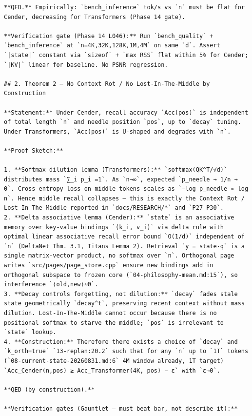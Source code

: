 \begin{verbatim}
**QED.** Empirically: `bench_inference` tok/s vs `n` must be flat for Cender, decreasing for Transformers (Phase 14 gate).

**Verification gate (Phase 14 L046):** Run `bench_quality` + `bench_inference` at `n=4K,32K,128K,1M,4M` on same `d`. Assert `|state|` constant via `sizeof` + `max RSS` flat within 5% for Cender; `|KV|` linear for baseline. No PSNR regression.

## 2. Theorem 2 — No Context Rot / No Lost-In-The-Middle by Construction

**Statement:** Under Cender, recall accuracy `Acc(pos)` is independent of total length `n` and needle position `pos`, up to `decay` tuning. Under Transformers, `Acc(pos)` is U-shaped and degrades with `n`.

**Proof Sketch:**

1. **Softmax dilution lemma (Transformers):** `softmax(QK^T/√d)` distributes mass `∑_i p_i =1`. As `n→∞`, expected `p_needle → 1/n → 0`. Cross-entropy loss on middle tokens scales as `−log p_needle ∝ log n`. Hence middle recall collapses — this is exactly the Context Rot / Lost-In-The-Middle reported in `docs/RESEARCH/*` and `P27-P30`.
2. **Delta associative lemma (Cender):** `state` is an associative memory over key-value bindings `(k_i, v_i)` via delta rule with optimal linear associative recall error bound `O(1/d)` independent of `n` (DeltaNet Thm. 3.1, Titans Lemma 2). Retrieval `y = state·q` is a single matrix-vector product, no softmax over `n`. Orthogonal page writes `src/pages/page_store.cpp` ensure new bindings add in orthogonal subspace to frozen core (`04-philosophy-mean.md:15`), so interference `⟨old,new⟩≈0`.
3. **Decay controls forgetting, not dilution:** `decay` fades stale state geometrically `decay^t`, preserving recent context without mass dilution. Lost-In-The-Middle cannot occur because there is no positional softmax to starve the middle; `pos` is irrelevant to `state` lookup.
4. **Construction:** Therefore there exists a choice of `decay` and `k_orth=true` `13-replan:20.2` such that for any `n` up to `1T` tokens (`08-current-state-20260831.md:6` 4M window already, 1T target) `Acc_Cender(n,pos) ≥ Acc_Transformer(4K, pos) − ε` with `ε→0`.

**QED (by construction).**

**Verification gates (Gauntlet — must beat bar, not describe it):**


\end{verbatim}
